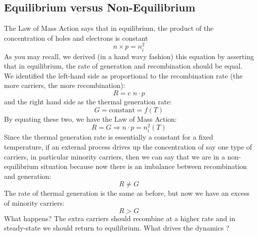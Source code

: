 \subsection{Equilibrium versus Non-Equilibrium}
The Law of Mass Action says that in equilibrium, the product of the concentration of holes and electrons is constant
\begin{equation}
	n \times p = n_i^2
\end{equation}
As you may recall, we derived (in a hand wavy fashion) this equation by asserting that in equilibrium, the rate of generation and recombination should be equal.  We identified the left-hand side as proportional to the recombination rate (the more carriers, the more recombination):
\begin{equation}
	R = c\,\, n \cdot p 
\end{equation}
and the right hand side as the thermal generation rate:
\begin{equation}
	G = \text{constant} = f(T) 
\end{equation}
By equating these two, we have the Law of Mass Action:
\begin{equation}
	R = G \Rightarrow n \cdot p = n_i^2(T) 
\end{equation}
Since the thermal generation rate is essentially a constant for a fixed temperature, if an external process drives up the concentration of say one type of carriers, in particular minority carriers, then we can say that we are in a non-equilibrium situation because now there is an imbalance between recombination and generation:  
\begin{equation}
	R \ne G 
\end{equation}
The rate of thermal generation is the same as before, but now we have an excess of minority carriers: 
\begin{equation}
	 R > G 
\end{equation}
What happens? The extra carriers should recombine at a higher rate and in steady-state we should return to equilibrium.  What drives the dynamics ?

